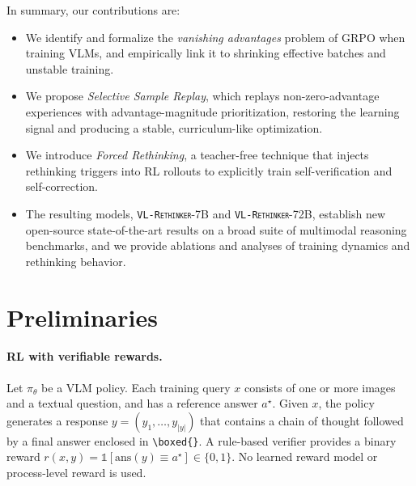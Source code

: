 \documentclass{article}
\newcommand{\model}{\texttt{\textsc{VL-Rethinker}}\xspace}
\begin{document}
In summary, our contributions are:
\begin{itemize}[leftmargin=*,itemsep=1pt,topsep=2pt]
    \item We identify and formalize the \emph{vanishing advantages} problem of GRPO when training VLMs, and empirically link it to shrinking effective batches and unstable training.
    \item We propose \emph{Selective Sample Replay}, which replays non-zero-advantage experiences with advantage-magnitude prioritization, restoring the learning signal and producing a stable, curriculum-like optimization.
    \item We introduce \emph{Forced Rethinking}, a teacher-free technique that injects rethinking triggers into RL rollouts to explicitly train self-verification and self-correction.
    \item The resulting models, \model-7B and \model-72B, establish new open-source state-of-the-art results on a broad suite of multimodal reasoning benchmarks, and we provide ablations and analyses of training dynamics and rethinking behavior.
\end{itemize}


\section{Preliminaries}
\label{sec:prelim}

\paragraph{RL with verifiable rewards.} Let $\pi_\theta$ be a VLM policy. Each training query $x$ consists of one or more images and a textual question, and has a reference answer $a^\star$. Given $x$, the policy generates a response $y=(y_1,\dots,y_{|y|})$ that contains a chain of thought followed by a final answer enclosed in \texttt{\textbackslash boxed\{\}}. A rule-based verifier provides a binary reward $r(x,y)=\mathbb{1}[\mathrm{ans}(y)\equiv a^\star]\in\{0,1\}$. No learned reward model or process-level reward is used.
\end{document}
